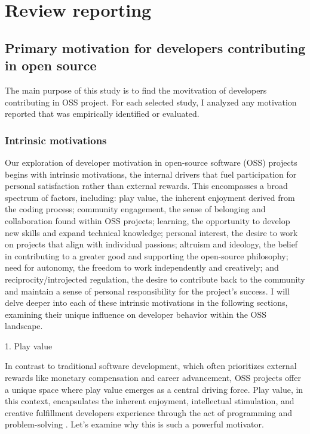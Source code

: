 \section{Review reporting}
\subsection{Primary motivation for developers contributing in open source}
The main purpose of this study is to find the movitvation of developers contributing in OSS project. For each selected study, I analyzed any motivation reported that was empirically identified or evaluated.

\subsubsection{Intrinsic motivations}
Our exploration of developer motivation in open-source software (OSS) projects begins with intrinsic motivations, the internal drivers that fuel participation for personal satisfaction rather than external rewards. This encompasses a broad spectrum of factors, including: play value, the inherent enjoyment derived from the coding process; community engagement, the sense of belonging and collaboration found within OSS projects; learning, the opportunity to develop new skills and expand technical knowledge; personal interest, the desire to work on projects that align with individual passions; altruism and ideology, the belief in contributing to a greater good and supporting the open-source philosophy; need for autonomy, the freedom to work independently and creatively; and reciprocity/introjected regulation, the desire to contribute back to the community and maintain a sense of personal responsibility for the project's success. I will delve deeper into each of these intrinsic motivations in the following sections, examining their unique influence on developer behavior within the OSS landscape.

1. Play value

In contrast to traditional software development, which often prioritizes external rewards like monetary compensation and career advancement, OSS projects offer a unique space where play value emerges as a central driving force. Play value, in this context, encapsulates the inherent enjoyment, intellectual stimulation, and creative fulfillment developers experience through the act of programming and problem-solving \parencite{05bitzer2007intrinsic, 06ye2003toward, 08zhang2024paid, 09lakhani2005hackers, 11gerosa2021shifting, 12choi2015characteristics,13li2012leadership,16ke2008motivations,17alexander2002working, 18oreg2008exploring}. Let's examine why this is such a powerful motivator.


